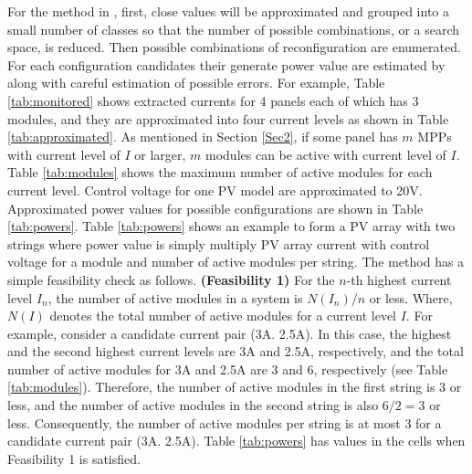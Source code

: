 \documentclass[conference]{pvsctran}
\begin{document}
For the method in \cite{orozco2016optimized}, first, close values will be approximated and grouped into a small number of classes so that the number of possible combinations, or a search space, is reduced.
Then possible combinations of reconfiguration are enumerated.
For each configuration candidates their generate power value are estimated by \cite{orozco2015fast} along with careful estimation of possible errors.
For example, Table \ref{tab:monitored} shows extracted currents for 4 panels each of which has 3 modules, and they are approximated into four current levels as shown in Table \ref{tab:approximated}. 
As mentioned in Section \ref{Sec2}, if some panel has $m$ MPPs with current level of $I$ or larger, $m$ modules can be active with current level of $I$. 
Table \ref{tab:modules} shows the maximum number of active modules for each current level.
Control voltage for one PV model are approximated to 20V.
Approximated power values for possible configurations are shown in Table \ref{tab:powers}. 
Table \ref{tab:powers} shows an example to form a PV array with two strings
where power value is simply multiply PV array current with control voltage for a module and number of active modules per string.
The method has a simple feasibility check as follows. 
\newline{}
\textbf{(Feasibility 1)} For the $n$-th highest current level $I_{n}$, the number of active modules in a system is $N(I_{n}) / n$ or less. 
\newline{}
Where, $N(I)$ denotes the total number of active modules for a current level $I$. 
For example, consider a candidate current pair (3A. 2.5A). In this case, the highest and the second highest current levels are 3A and 2.5A, respectively, and the total number of active modules for 3A and 2.5A are 3 and 6, respectively (see Table \ref{tab:modules}). Therefore, the number of active modules in the first string is 3 or less, and the number of active modules in the second string is also $ 6/2  = 3$ or less. Consequently, the number of active modules per string is at most 3 for a candidate current pair (3A. 2.5A). Table \ref{tab:powers} has values in the cells when Feasibility 1 is satisfied. 
\end{document}
